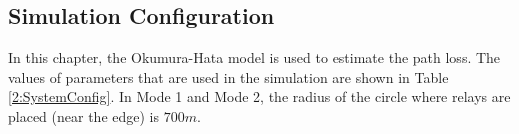 
\subsection{Simulation Configuration}
In this chapter, the Okumura-Hata model \cite{saunders2007antennas} is used to estimate the path loss.
The values of parameters that are used in the simulation are shown in Table \ref{2:SystemConfig}. In Mode 1 and Mode 2, the radius of the circle where relays are placed (near the edge) is $700m$.
